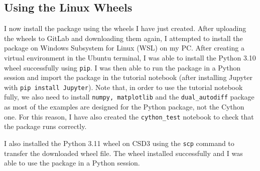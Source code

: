\documentclass{article}
\begin{document}
 \subsection{ Using the Linux Wheels }

I now install the package using the wheels I have just created. After uploading the wheels to GitLab and downloading them again, I attempted to install the package on Windows Subsystem for Linux (WSL) on my PC. After creating a virtual environment in the Ubuntu terminal, I was able to install the Python 3.10 wheel successfully using \texttt{pip}. I was then able to run the package in a Python session and import the package in the tutorial notebook (after installing Jupyter with \texttt{pip install Jupyter}). Note that, in order to use the tutorial notebook fully, we also need to install \texttt{numpy, matplotlib} and the \texttt{dual\_autodiff} package as most of the examples are designed for the Python package, not the Cython one. For this reason, I have also created the \texttt{cython\_test} notebook to check that the package runs correctly. 

I also installed the Python 3.11 wheel on CSD3 using the \texttt{scp} command to transfer the downloaded wheel file. The wheel installed successfully and I was able to use the package in a Python session. 
\end{document}
